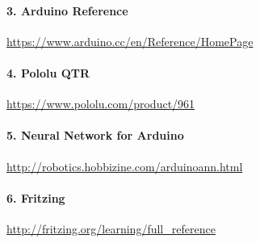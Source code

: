 \documentclass[14pt,a4paper]{extarticle}
\begin{document}
\paragraph{3. Arduino Reference}
\url{https://www.arduino.cc/en/Reference/HomePage}

\paragraph{4. Pololu QTR} 
\url{https://www.pololu.com/product/961}

\paragraph{5. Neural Network for Arduino}
\url{http://robotics.hobbizine.com/arduinoann.html}

\paragraph{6. Fritzing}
\url{http://fritzing.org/learning/full_reference}
	
\end{document}
